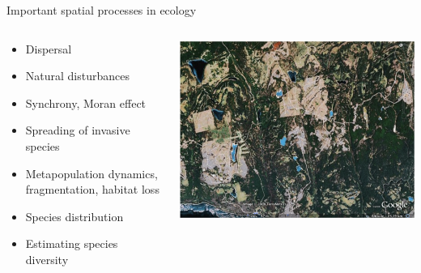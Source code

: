 \documentclass{eecslides}
\begin{document}

	\begin{frame}{Important spatial processes in ecology}

		\begin{columns}
			\begin{column}{0.5\textwidth}
			\begin{itemize}
				\item Dispersal
				\item Natural disturbances
				\item Synchrony, Moran effect
				\item Spreading of invasive species
				\item Metapopulation dynamics, fragmentation, habitat loss
				\item Species distribution
				\item Estimating species diversity
			\end{itemize}	
			\end{column}
			\begin{column}{0.5\textwidth}
				\begin{center}
					\includegraphics[height=0.3\textheight]{fragmentation}
				\end{center}
				\begin{center}

\end{center}
\end{column}
\end{columns}
\end{frame}
\end{document}
